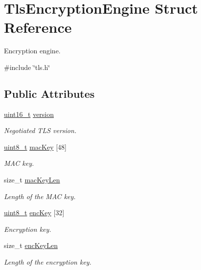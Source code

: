 \hypertarget{structTlsEncryptionEngine}{}\section{Tls\+Encryption\+Engine Struct Reference}
\label{structTlsEncryptionEngine}


Encryption engine.  




{\ttfamily \#include \char`\"{}tls.\+h\char`\"{}}

\subsection*{Public Attributes}
\begin{DoxyCompactItemize}
\item 
\hyperlink{stdint_8h_a273cf69d639a59973b6019625df33e30}{uint16\+\_\+t} \hyperlink{structTlsEncryptionEngine_aa340a0b969c2b0f795556e66a68fae27}{version}
\begin{DoxyCompactList}\small\item\em Negotiated T\+LS version. \end{DoxyCompactList}\item 
\hyperlink{stdint_8h_aba7bc1797add20fe3efdf37ced1182c5}{uint8\+\_\+t} \hyperlink{structTlsEncryptionEngine_addc5682b60f0e934f1b838909b8aea7c}{mac\+Key} \mbox{[}48\mbox{]}
\begin{DoxyCompactList}\small\item\em M\+AC key. \end{DoxyCompactList}\item 
size\+\_\+t \hyperlink{structTlsEncryptionEngine_a26e44e1dbfb86e7a0f118dc4d859d7ab}{mac\+Key\+Len}
\begin{DoxyCompactList}\small\item\em Length of the M\+AC key. \end{DoxyCompactList}\item 
\hyperlink{stdint_8h_aba7bc1797add20fe3efdf37ced1182c5}{uint8\+\_\+t} \hyperlink{structTlsEncryptionEngine_ac52797db6bbb0e89321c969292dfddd6}{enc\+Key} \mbox{[}32\mbox{]}
\begin{DoxyCompactList}\small\item\em Encryption key. \end{DoxyCompactList}\item 
size\+\_\+t \hyperlink{structTlsEncryptionEngine_ad657d271cd7780efcb7d2005737256dd}{enc\+Key\+Len}
\begin{DoxyCompactList}\small\item\em Length of the encryption key. \end{DoxyCompactList}\item 

\end{DoxyCompactItemize}
